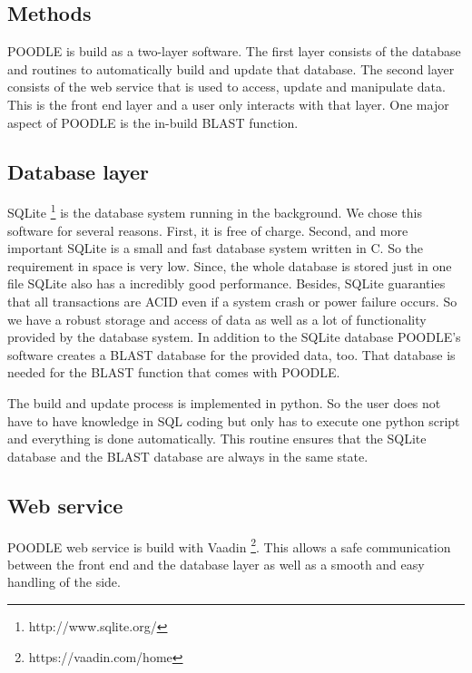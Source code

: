 \documentclass{bioinfo}
\begin{document}
\begin{methods}
\section{Methods}

POODLE is build as a two-layer software. The first layer consists of the database and routines to 
automatically build and update that database. The second layer consists of the web service that is 
used to access, update and manipulate data. This is the front end layer and a user only interacts 
with that layer. One major aspect of POODLE is the in-build BLAST function.

\subsection{Database layer}

SQLite \footnote{http://www.sqlite.org/} is the database system running in the background. We chose 
this software for several reasons. First, it is free of charge. Second, and more important SQLite is 
a small and fast database system written in C. So the requirement in space is very low. Since, the 
whole database is stored just in one file SQLite also has a incredibly good performance. Besides, 
SQLite guaranties that all transactions are ACID even if a system crash or power failure occurs. So 
we have a robust storage and access of data as well as a lot of functionality provided by the database 
system. In addition to the SQLite database POODLE's software creates a BLAST database for the provided 
data, too. That database is needed for the BLAST function that comes with POODLE.

The build and update process is implemented in python. So the user does not have to have knowledge in 
SQL coding but only has to execute one python script and everything is done automatically. This routine 
ensures that the SQLite database and the BLAST database are always in the same state.

\subsection{Web service}

POODLE web service is build with Vaadin \footnote{https://vaadin.com/home}. This allows a safe 
communication between the front end and the database layer as well as a smooth and easy handling of 
the side. 

\end{methods}
\end{document}
